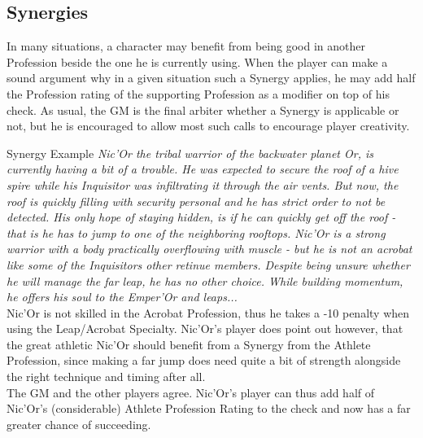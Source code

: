 \subsection{Synergies}\label{Synergy}
In many situations, a character may benefit from being good in another Profession beside the one he is currently using.
When the player can make a sound argument why in a given situation such a Synergy applies, he may add half the Profession rating of the supporting Profession as a modifier on top of his check. 
As usual, the GM is the final arbiter whether a Synergy is applicable or not, but he is encouraged to allow most such calls to encourage player creativity.
\begin{DndSidebar}{Synergy Example}
	\textit{Nic'Or the tribal warrior of the backwater planet Or, is currently having a bit of a trouble. He was expected to secure the roof of a hive spire while his Inquisitor was infiltrating it through the air vents. But now, the roof is quickly filling with security personal and he has strict order to not be detected. His only hope of staying hidden, is if he can quickly get off the roof - that is he has to jump to one of the neighboring rooftops. Nic'Or is a strong warrior with a body practically overflowing with muscle - but he is not an acrobat like some of the Inquisitors other retinue members. Despite being unsure whether he will manage the far leap, he has no other choice. While building momentum, he offers his soul to the Emper'Or and leaps...}\\
	Nic'Or is not skilled in the Acrobat Profession, thus he takes a -10 penalty when using the Leap/Acrobat Specialty. Nic'Or's player does point out however, that the great athletic Nic'Or should benefit from a Synergy from the Athlete Profession, since making a far jump does need quite a bit of strength alongside the right technique and timing after all.\\
	The GM and the other players agree. Nic'Or's player can thus add half of Nic'Or's (considerable) Athlete Profession Rating to the check and now has a far greater chance of succeeding.
\end{DndSidebar}


